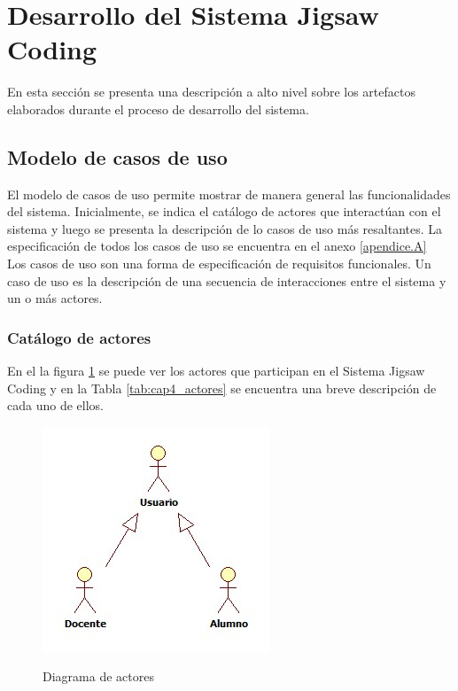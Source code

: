\section{Desarrollo del Sistema Jigsaw Coding}
En esta sección se presenta una descripción a alto nivel sobre los artefactos elaborados durante el proceso de desarrollo del sistema.

\subsection{Modelo de casos de uso}
El modelo de casos de uso permite mostrar de manera general las funcionalidades del sistema. Inicialmente, se indica el catálogo de actores que interactúan con el sistema y luego se presenta la descripción de lo casos de uso más resaltantes. La especificación de todos los casos de uso se encuentra en el anexo \ref{apendice.A}\\

Los casos de uso son una forma de especificación de requisitos funcionales. Un caso de uso es la descripción de una secuencia de interacciones entre el sistema y un o más actores.\\

\subsubsection{Catálogo de actores}
En el la figura \ref{fig:cap4_actores} se puede ver los actores que participan en el Sistema Jigsaw Coding y en la Tabla \ref{tab:cap4_actores} se encuentra una breve descripción de cada uno de ellos.
\begin{figure}
	\centering
	\includegraphics[scale=0.6]{figuras/casosdeuso/actores.jpg}\\
	\caption[Diagrama de actores]{Diagrama de actores}
	\label{fig:cap4_actores}
\end{figure}

